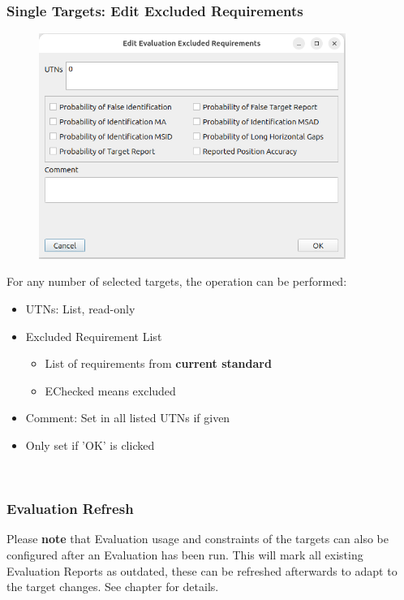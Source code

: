 \subsubsection{Single Targets: Edit Excluded Requirements}

\begin{figure}[H]
  \center
  \includegraphics[width=10cm,frame]{figures/eval_targets_excl_req.png}
\end{figure}

For any number of selected targets, the operation can be performed:
\begin{itemize}
  \item UTNs: List, read-only
  \item Excluded Requirement List
  \begin{itemize}
  \item List of requirements from \textbf{current standard}
  \item EChecked means excluded
\end{itemize} 
  \item Comment: Set in all listed UTNs if given
  \item Only set if 'OK' is clicked
\end{itemize} 
\ \\

\subsubsection{Evaluation Refresh}

Please \textbf{note} that Evaluation usage and constraints of the targets can also be configured after an Evaluation has been run.
This will mark all existing Evaluation Reports as outdated, these can be refreshed afterwards to adapt to the target changes.
See chapter  for details.

